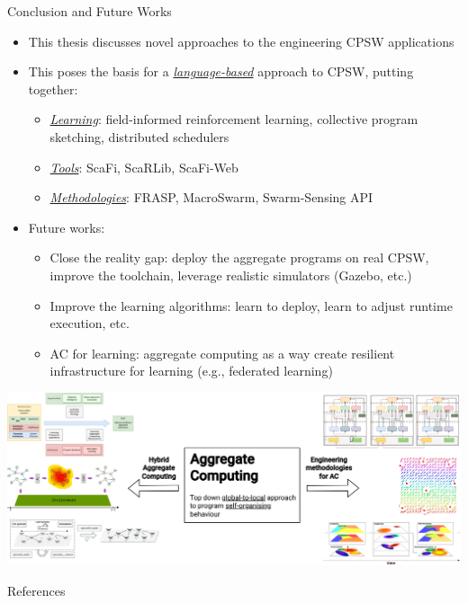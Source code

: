 \documentclass[presentation, 8pt,169]{beamer}\mode<presentation>{\usetheme{AMSBolognaFC}}
\begin{document}
\begin{frame}{Conclusion and Future Works}
\begin{itemize}
  \item This thesis discusses novel approaches to the engineering CPSW applications
  \item This poses the basis for a \emph{\underline{language-based}} approach to CPSW, putting together:
  \begin{itemize}
    \item \emph{\underline{Learning}}: field-informed reinforcement learning, collective program sketching, distributed schedulers
    \item \emph{\underline{Tools}}: ScaFi, ScaRLib, ScaFi-Web
    \item \emph{\underline{Methodologies}}: FRASP, MacroSwarm, Swarm-Sensing API
  \end{itemize}
  \item Future works:
  \begin{itemize}
    \item Close the reality gap: deploy the aggregate programs on real CPSW, improve the toolchain, leverage realistic simulators (Gazebo, etc.)
    \item Improve the learning algorithms: learn to deploy, learn to adjust runtime execution, etc.
    \item AC for learning: aggregate computing as a way create resilient infrastructure for learning (e.g., federated learning)
  \end{itemize}
\end{itemize}
\end{frame}

\begin{frame}
\includegraphics[width=\textwidth]{img/contribution.drawio.png}
\end{frame}
\begin{frame}[allowframebreaks]{References}
  \def\bibfont{\footnotesize}
  \printbibliography
\end{frame}

\end{document}
